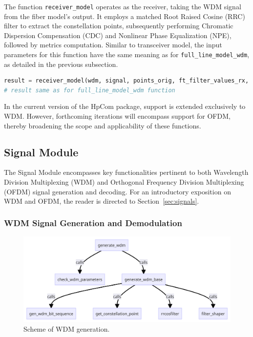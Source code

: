 The function \texttt{receiver\_model} operates as the receiver, taking the WDM signal from the fiber model's output. It employs a matched Root Raised Cosine (RRC) filter to extract the constellation points, subsequently performing Chromatic Dispersion Compensation (CDC) and Nonlinear Phase Equalization (NPE), followed by metrics computation. Similar to transceiver model, the input parameters for this function have the same meaning as for \texttt{full\_line\_model\_wdm}, as detailed in the previous subsection.

\begin{lstlisting}[language=Python, caption=Usage of \texttt{receiver\_model} function, label=lst:rx_model]
result = receiver_model(wdm, signal, points_orig, ft_filter_values_rx, channels_type='all', verbose=0, optimise='not')
# result same as for full_line_model_wdm function
\end{lstlisting}

In the current version of the HpCom package, support is extended exclusively to WDM. However, forthcoming iterations will encompass support for OFDM, thereby broadening the scope and applicability of these functions.


\subsection{Signal Module}
The Signal Module encompasses key functionalities pertinent to both Wavelength Division Multiplexing (WDM) and Orthogonal Frequency Division Multiplexing (OFDM) signal generation and decoding. For an introductory exposition on WDM and OFDM, the reader is directed to Section~\ref{sec:signals}.


\subsubsection{WDM Signal Generation and Demodulation}

\begin{figure}[t]
   \centering
        \includegraphics[width=0.8\linewidth]{images/hpcom/wdm_generation.png}
    \caption{Scheme of WDM generation.}
    \label{fig:wdm_generation}
\end{figure}

